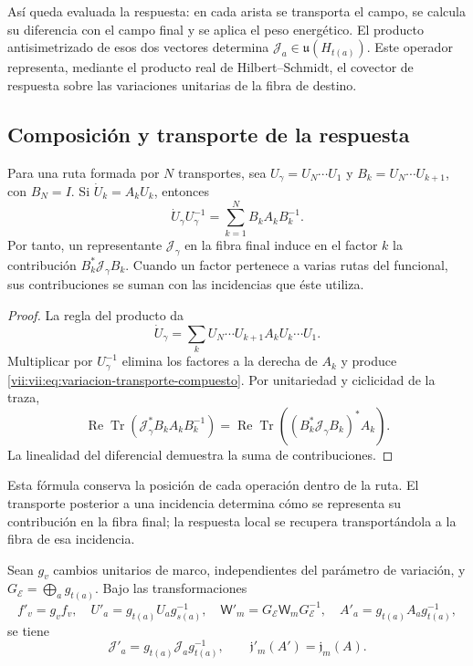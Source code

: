 Así queda evaluada la respuesta: en cada arista se transporta el campo,
se calcula su diferencia con el campo final y se aplica el peso energético.
El producto antisimetrizado de esos dos vectores determina
\(\mathcal J_a\in\mathfrak u(H_{t(a)})\). Este operador representa,
mediante el producto real de Hilbert--Schmidt, el covector de respuesta
sobre las variaciones unitarias de la fibra de destino.

\subsection{Composición y transporte de la respuesta}
\label{vii:vii:subsec:composicion-respuesta}

\begin{proposition}
\label{vii:vii:prop:composicion-respuesta}
Para una ruta formada por \(N\) transportes, sea
\(U_\gamma=U_N\cdots U_1\) y
\(B_k=U_N\cdots U_{k+1}\), con \(B_N=I\).
Si \(\dot U_k=A_kU_k\), entonces
\begin{equation}
 \dot U_\gamma U_\gamma^{-1}
 =\sum_{k=1}^N B_kA_kB_k^{-1}.
 \label{vii:vii:eq:variacion-transporte-compuesto}
\end{equation}
Por tanto, un representante \(\mathcal J_\gamma\) en la fibra final
induce en el factor \(k\) la contribución
\(B_k^*\mathcal J_\gamma B_k\). Cuando un factor pertenece a varias
rutas del funcional, sus contribuciones se suman con las incidencias
que éste utiliza.
\end{proposition}

\begin{proof}
La regla del producto da
\[
 \dot U_\gamma=\sum_k
 U_N\cdots U_{k+1}A_kU_k\cdots U_1.
\]
Multiplicar por \(U_\gamma^{-1}\) elimina los factores a la derecha
de \(A_k\) y produce \eqref{vii:vii:eq:variacion-transporte-compuesto}.
Por unitariedad y ciclicidad de la traza,
\[
 \operatorname{Re}\operatorname{Tr}
   (\mathcal J_\gamma^*B_kA_kB_k^{-1})
 =\operatorname{Re}\operatorname{Tr}
   ((B_k^*\mathcal J_\gamma B_k)^*A_k).
\]
La linealidad del diferencial demuestra la suma de contribuciones.
\end{proof}

Esta fórmula conserva la posición de cada operación dentro de la ruta.
El transporte posterior a una incidencia determina cómo se representa
su contribución en la fibra final; la respuesta local se recupera
transportándola a la fibra de esa incidencia.

\begin{proposition}
\label{vii:vii:prop:covariancia-corriente-memoria}
Sean \(g_v\) cambios unitarios de marco, independientes del parámetro
de variación, y \(G_{\mathcal E}=\bigoplus_a g_{t(a)}\).
Bajo las transformaciones
\[
 f'_v=g_vf_v,\quad U'_a=g_{t(a)}U_ag_{s(a)}^{-1},\quad
 \mathsf W'_m=G_{\mathcal E}\mathsf W_mG_{\mathcal E}^{-1},\quad
 A'_a=g_{t(a)}A_ag_{t(a)}^{-1},
\]
se tiene
\begin{equation}
 \mathcal J'_a=g_{t(a)}\mathcal J_ag_{t(a)}^{-1},
 \qquad \mathfrak j'_m(A')=\mathfrak j_m(A).
 \label{vii:vii:eq:covariancia-respuesta}
\end{equation}
\end{proposition}

